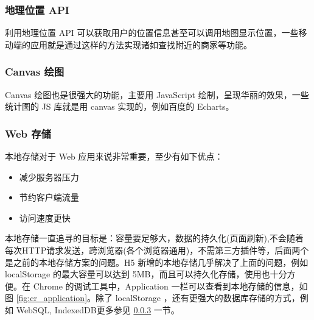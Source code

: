             \subsubsection{地理位置 API}
              \label{subsubsec:地理位置_api}
                利用地理位置 API 可以获取用户的位置信息甚至可以调用地图显示位置，一些移动端的应用就是通过这样的方法实现诸如查找附近的商家等功能。

            \subsubsection{Canvas 绘图}
              \label{subsubsec:canvas_绘图}
                Canvas 绘图也是很强大的功能，主要用 JavaScript 绘制，呈现华丽的效果，一些统计图的 JS 库就是用 canvas 实现的，例如百度的 Echarts。

            \subsubsection{Web 存储}
              \label{subsubsec:web_存储}
                本地存储对于 Web 应用来说非常重要，至少有如下优点：
                \begin{itemize}
                  \item 减少服务器压力
                  \item 节约客户端流量
                  \item 访问速度更快
                \end{itemize}
                \par
                本地存储一直追寻的目标是：容量要足够大，数据的持久化(页面刷新),不会随着每次HTTP请求发送，跨浏览器(各个浏览器通用)，不需第三方插件等，后面两个是之前的本地存储方案的问题。H5 新增的本地存储几乎解决了上面的问题，例如 localStorage 的最大容量可以达到 5MB，而且可以持久化存储，使用也十分方便。在 Chrome 的调试工具中，Application 一栏可以查看到本地存储的信息，如图 \ref{fig:cr_application}。除了 localStorage ，还有更强大的数据库存储的方式，例如 WebSQL, IndexedDB更多参见 \ref{subsubsec:web_存储} 一节。

